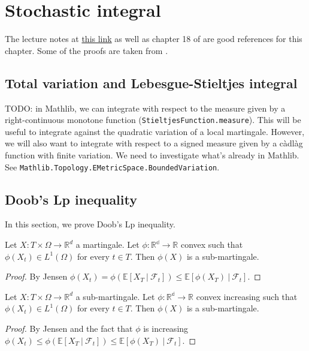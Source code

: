 \chapter{Stochastic integral}

The lecture notes at \href{https://dec41.user.srcf.net/h/III_L/stochastic_calculus_and_applications/}{this link} as well as chapter 18 of \cite{kallenberg2021} are good references for this chapter.
Some of the proofs are taken from \cite{pascucci2024}.

\section{Total variation and Lebesgue-Stieltjes integral}

TODO: in Mathlib, we can integrate with respect to the measure given by a right-continuous monotone function (\texttt{StieltjesFunction.measure}). This will be useful to integrate against the quadratic variation of a local martingale.
However, we will also want to integrate with respect to a signed measure given by a càdlàg function with finite variation.
We need to investigate what's already in Mathlib. See \texttt{Mathlib.Topology.EMetricSpace.BoundedVariation}.


\section{Doob's Lp inequality}

In this section, we prove Doob's Lp inequality.

\begin{lemma}\label{lem:convex_of_mg_is_submg}
  Let $X:T\times\Omega\rightarrow \mathbb{R}^d$ a martingale.
  Let $\phi:\mathbb{R^d}\rightarrow \mathbb{R}$ convex such that
  $\phi(X_t)\in L^1(\Omega)$ for every $t\in T$. Then $\phi(X)$ is a sub-martingale.
\end{lemma}
\begin{proof}
  By Jensen
  $\phi(X_t) = \phi\left( \mathbb{E}[X_T\ |\ \mathcal{F}_t] \right)\leq \mathbb{E}[\phi(X_T)\ |\ \mathcal{F}_t]$.
\end{proof}

\begin{lemma}\label{lem:convex_of_submg_is_submg}
  Let $X:T\times\Omega\rightarrow \mathbb{R}^d$ a sub-martingale.
  Let $\phi:\mathbb{R^d}\rightarrow \mathbb{R}$ convex increasing such that
  $\phi(X_t)\in L^1(\Omega)$ for every $t\in T$. Then $\phi(X)$ is a sub-martingale.
\end{lemma}
\begin{proof}
  By Jensen and the fact that $\phi$ is increasing
  $\phi(X_t) \leq \phi\left( \mathbb{E}[X_T\ |\ \mathcal{F}_t] \right)\leq \mathbb{E}[\phi(X_T)\ |\ \mathcal{F}_t]$.
\end{proof}

